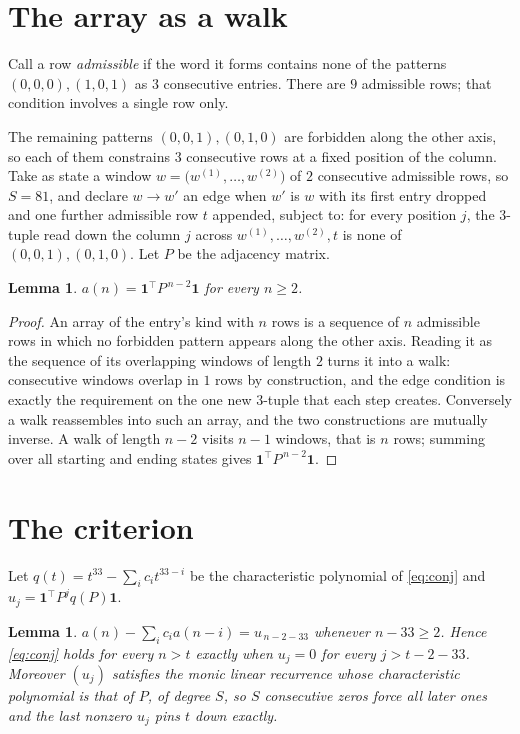 \documentclass[11pt,a4paper]{article}
\theoremstyle{plain}
\newtheorem{lemma}[theorem]{Lemma}
\theoremstyle{definition}
\begin{document}
\section{The array as a walk}

Call a row \emph{admissible} if the word it forms contains none of the patterns
$(0,0,0), (1,0,1)$ as $3$ consecutive entries. There are $9$ admissible rows; that condition
involves a single row only.

The remaining patterns $(0,0,1), (0,1,0)$ are forbidden along the other axis, so each of them
constrains $3$ consecutive rows at a fixed position of the column. Take as state a
window $w=\bigl(w^{(1)},\dots,w^{(2)}\bigr)$ of $2$ consecutive admissible
rows, so $S=81$, and declare $w\to w'$ an edge when $w'$ is $w$ with its first entry
dropped and one further admissible row $t$ appended, subject to: for every position
$j$, the $3$-tuple read down the column $j$ across $w^{(1)},\dots,w^{(2)},t$
is none of $(0,0,1), (0,1,0)$. Let $P$ be the adjacency matrix.

\begin{lemma}\label{lem:walk}
$a(n)=\mathbf{1}^{\!\top}P^{\,n-2}\mathbf{1}$ for every $n\ge2$.
\end{lemma}

\begin{proof}
An array of the entry's kind with $n$ rows is a sequence of $n$ admissible rows in
which no forbidden pattern appears along the other axis. Reading it as the sequence of its
overlapping windows of length $2$ turns it into a walk: consecutive windows overlap in
$1$ rows by construction, and the edge condition is exactly the requirement on the one
new $3$-tuple that each step creates. Conversely a walk reassembles into such an array,
and the two constructions are mutually inverse. A walk of length $n-2$ visits $n-1$
windows, that is $n$ rows; summing over all starting and ending states gives
$\mathbf{1}^{\!\top}P^{\,n-2}\mathbf{1}$.
\end{proof}

\section{The criterion}

Let $q(t)=t^{33}-\sum_i c_i t^{33-i}$ be the characteristic polynomial of
\eqref{eq:conj} and $u_j=\mathbf{1}^{\!\top}P^{j}q(P)\mathbf{1}$.

\begin{lemma}\label{lem:crit}
$a(n)-\sum_i c_i a(n-i)=u_{\,n-2-33}$ whenever $n-33\ge2$. Hence
\eqref{eq:conj} holds for every $n>t$ exactly when $u_j=0$ for every
$j>t-2-33$. Moreover $(u_j)$ satisfies the monic linear recurrence whose
characteristic polynomial is that of $P$, of degree $S$, so $S$ consecutive zeros force all
later ones and the last nonzero $u_j$ pins $t$ down exactly.
\end{lemma}
\end{document}
